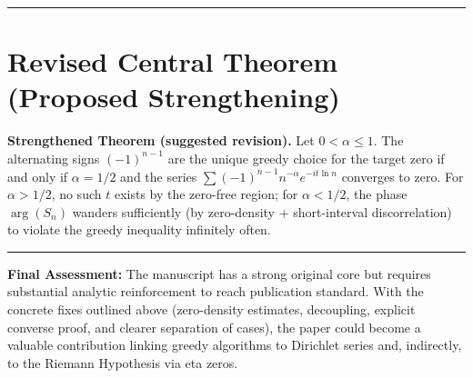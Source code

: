 \documentclass[11pt,a4paper]{article}
\begin{document}
\bigskip\hrule\bigskip

\section{Revised Central Theorem (Proposed Strengthening)}

\begin{tcolorbox}[mathblock]
\textbf{Strengthened Theorem (suggested revision).}
Let $0 < \alpha \le 1$. The alternating signs $(-1)^{n-1}$ are the unique greedy choice for the target zero if and only if $\alpha = 1/2$ and the series $\sum (-1)^{n-1} n^{-\alpha} e^{-it\ln n}$ converges to zero. For $\alpha > 1/2$, no such $t$ exists by the zero-free region; for $\alpha < 1/2$, the phase $\arg(S_n)$ wanders sufficiently (by zero-density + short-interval discorrelation) to violate the greedy inequality infinitely often.
\end{tcolorbox}

\bigskip\hrule\bigskip

\noindent\textbf{Final Assessment:} The manuscript has a strong original core but requires substantial analytic reinforcement to reach publication standard. With the concrete fixes outlined above (zero-density estimates, decoupling, explicit converse proof, and clearer separation of cases), the paper could become a valuable contribution linking greedy algorithms to Dirichlet series and, indirectly, to the Riemann Hypothesis via eta zeros.

\bigskip
{}
\end{document}
